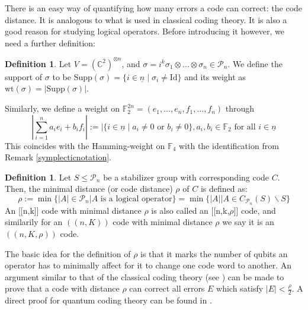 \documentclass[12pt,a4paper,BCOR15mm,twoside,DIV12]{article}
\def\P{\mathcal{P}}
\def\F{\mathbb{F}}
\def\C{\mathbb{C}}
\def\supp{\text{Supp}}
\def\n{\underline{n}}
\def\fa{\text{ for all }}
\def\Id{\text{Id}}
\def\wt{\text{wt}}
\theoremstyle{definition}
\newtheorem{defn}[Satz]{Definition}
\begin{document}
There is an easy way of quantifying how many errors a code can correct: the code distance. It is analogous to what is used in classical coding theory. It is also a good reason for studying logical operators. Before introducing it however, we need a further definition:

\begin{defn}\label{weight}
Let $V = (\C^2)^{\otimes n}$, and $\sigma = i^k \sigma_1 \otimes \ldots \otimes \sigma_n \in \mathcal{P}_n$. We define the support of $\sigma$ to be $\supp(\sigma) = \{ i \in \underline{n} \mid \sigma_i \neq \Id \}$ and
its weight as $\wt(\sigma) = | \supp( \sigma) |$. 

Similarly, we define a weight on $\F_2^{2n} = (e_1,\ldots,e_n,f_1,\ldots,f_n)$ through \begin{equation} | \sum_{i=1}^n a_i e_i + b_i f_i | := | \{ i \in \n \mid a_i \neq 0 \text{ or } b_i \neq 0 \}, a_i, b_i \in \F_2 \fa i \in \n \end{equation} This coincides with the Hamming-weight on $\F_4$ with the identification from Remark \ref{symplecticnotation}.
\end{defn}


\begin{defn}\label{defdist}
Let $S \leq \P_n$ be a stabilizer group with corresponding code $C$. Then, the minimal distance (or code distance) $\rho$ of $C$ is defined as:
\begin{equation} \rho := \min \{ |A| \in \P_n | A \text{ is a logical operator} \} = \min \{ |A| \mid A \in C_{\P_n}(S)\backslash S \} \end{equation}
An [[n,k]] code with minimal distance $\rho$ is also called an [[n,k,$\rho$]] code, and similarily for an $((n,K))$ code with minimal distance $\rho$ we say it is an $((n,K,\rho))$ code.
\end{defn}



The basic idea for the definition of $\rho$ is that it marks the number of qubits an operator has to minimally affect for it to change one code word to another. 
An argument similar to that of the classical coding theory (see \cite{classicalcodes}) can be made to prove that a code with distance $\rho$ can correct all errors $E$ which satisfy $|E| < \frac{\rho}{2}$. A direct proof for quantum coding theory can be found in \cite{leemhuis}.
\end{document}
